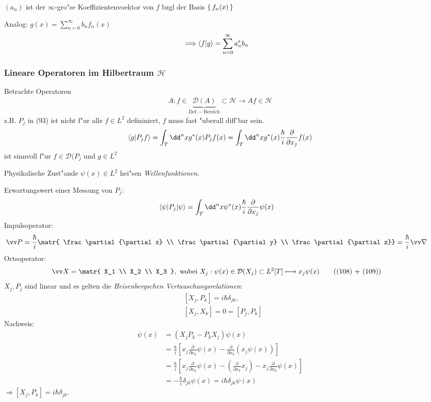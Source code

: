 \documentclass[a4paper]{scrartcl}
\begin{document}
{$(a_n)$ ist  der $\infty$-gro"se Koeffizientenvoektor von $f$ bzgl der Basis $\set{ f_n(x) }$

Analog: $g(x) = \sum_{n=0}^\infty b_n f_n(x)$
\begin{align}
\Longrightarrow \braket{f | g} & = \sum_{n=0}^\infty a_n^* b_n
\end{align}

\subsubsection*{Lineare Operatoren im Hilbertraum $\mathcal H$}
Betrachte Operatoren
\begin{align}
A: f \in \underbrace{\mathcal D(A)}_{\mathrm{Def.-Bereich}} \subset \mathcal H \longrightarrow A f \in \mathcal{H} 
\end{align}
z.B. $P_j$ in (93) ist nicht f"ur alle $f \in L^2$ defininiert, $f$ muss fast "uberall diff'bar sein.
$$\braket{g | P_j f} = \int_T \dd^n x g^*(x) P_jf(x) = \int_T \dd^n x g^*(x) \frac \hbar i \frac \partial{\partial x_j} f(x)$$
ist sinnvoll f"ur $f \in \mathcal D(P_j$ und $g \in L^2$

Physikalische Zust"ande $\psi(x) \in L^2$ hei"sen \emph{Wellenfunktionen}.

Erwartungswert einer Messung von $P_j$:
\begin{align}
\braket{ \psi | P_j | \psi} & = \int_T \dd^nx \psi^*(x) \frac{\hbar}{i} \frac \partial {\partial x_j} \psi(x)
\end{align}
Impulsoperator:
\begin{align}
\vv P & = \frac \hbar i \matr{ \frac \partial {\partial x} \\ \frac \partial {\partial y} \\ \frac \partial {\partial z}} = \frac \hbar i \vv \nabla
\end{align}
Ortsoperator:
\begin{align}
\vv X & = \matr{ X_1 \\ X_2 \\ X_3 }, \mathrm{ \ wobei \ }
X_j: \psi(x) \in \mathcal D (X_j) \subset L^2[T] \longmapsto x_j \psi(x) \tag{(108) + (109)}
\end{align}
\setcounter{equation}{109}
$X_j, P_j$ sind linear und es gelten die \emph{Heisenbergschen Vertauschungsrelationen}:
\begin{eqnarray}
& \left[ X_j, P_k \right]  = i\hbar \delta_{jk}, \\
& \left[ X_j, X_k \right]  = 0 = [ P_j, P_k ]
\end{eqnarray}
Nachweis:
\begin{align*}
[ X_j, P_k] \psi(x) &= (X_j P_k - P_k X_j) \psi(x) \\
& = \frac \hbar i \left[ x_j \frac \partial {\partial x_k} \psi(x) - \frac \partial {\partial x_k} (x_j \psi(x)) \right] \\
& = \frac \hbar i \left[ x_j \frac \partial {\partial x_k} \psi(x) - {\left( \frac \partial {\partial x_k} x_j \right)} - x_j \frac \partial {\partial x_k} \psi(x) \right] \\
& = - \frac \hbar i \delta_{jk} \psi(x) = i \hbar \delta_{jk} \psi(x)
\end{align*}
$\Longrightarrow [X_j, P_k] = i \hbar \delta_{jk}$.

}
\end{document}
